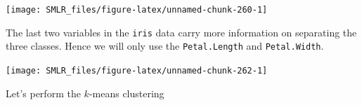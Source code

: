 \documentclass[
]{book}
\newenvironment{Shaded}{\begin{snugshade}}{\end{snugshade}}
\newcommand{\AttributeTok}[1]{\textcolor[rgb]{0.13,0.29,0.53}{#1}}
\newcommand{\ConstantTok}[1]{\textcolor[rgb]{0.56,0.35,0.01}{#1}}
\newcommand{\DecValTok}[1]{\textcolor[rgb]{0.00,0.00,0.81}{#1}}
\newcommand{\FloatTok}[1]{\textcolor[rgb]{0.00,0.00,0.81}{#1}}
\newcommand{\FunctionTok}[1]{\textcolor[rgb]{0.13,0.29,0.53}{\textbf{#1}}}
\newcommand{\NormalTok}[1]{#1}
\newcommand{\SpecialCharTok}[1]{\textcolor[rgb]{0.81,0.36,0.00}{\textbf{#1}}}
\theoremstyle{definition}
\theoremstyle{definition}
\theoremstyle{definition}
\theoremstyle{definition}
\theoremstyle{remark}
\begin{document}
\begin{center}\texttt{[image: SMLR\_files/figure-latex/unnamed-chunk-260-1]} \end{center}

The last two variables in the \texttt{iris} data carry more information on separating the three classes. Hence we will only use the \texttt{Petal.Length} and \texttt{Petal.Width}.

\begin{Shaded}
\end{Shaded}

\begin{center}\texttt{[image: SMLR\_files/figure-latex/unnamed-chunk-262-1]} \end{center}

Let's perform the \(k\)-means clustering
\end{document}
